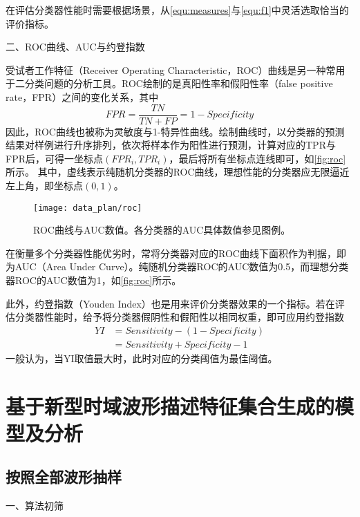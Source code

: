 在评估分类器性能时需要根据场景，从\autoref{equ:measures}与\autoref{equ:f1}中灵活选取恰当的评价指标。

二、ROC曲线、AUC与约登指数

受试者工作特征（Receiver Operating Characteristic，ROC）曲线是另一种常用于二分类问题的分析工具。ROC绘制的是真阳性率和假阳性率（false positive rate，FPR）之间的变化关系，其中
\begin{equation}
      \label{equ:fpr}
      FPR=\frac{TN}{TN+FP}=1-Specificity
\end{equation}
因此，ROC曲线也被称为灵敏度与1-特异性曲线。绘制曲线时，以分类器的预测结果对样例进行升序排列，依次将样本作为阳性进行预测，计算对应的TPR与FPR后，可得一坐标点$({FPR}_i,{TPR}_i)$，最后将所有坐标点连线即可，如\autoref{fig:roc}所示。
其中，虚线表示纯随机分类器的ROC曲线，理想性能的分类器应无限逼近左上角，即坐标点$(0,1)$。
\begin{figure}[htbp]
      \centering
      \texttt{[image: data\_plan/roc]}
      \caption[ROC曲线与AUC数值]{\label{fig:roc}ROC曲线与AUC数值。各分类器的AUC具体数值参见图例。}
\end{figure}

在衡量多个分类器性能优劣时，常将分类器对应的ROC曲线下面积作为判据，即为AUC（Area Under Curve）。纯随机分类器ROC的AUC数值为0.5，而理想分类器ROC的AUC数值为1，如\autoref{fig:roc}所示。

此外，约登指数（Youden Index）也是用来评价分类器效果的一个指标。若在评估分类器性能时，给予将分类器假阴性和假阳性以相同权重，即可应用约登指数
\begin{equation}
      \label{equ:yi}
      \begin{aligned}
            YI&=Sensitivity-(1-Specificity)\\
            &=Sensitivity+Specificity-1
      \end{aligned}
\end{equation}
一般认为，当YI取值最大时，此时对应的分类阈值为最佳阈值\cite{cwl}。

\section{基于新型时域波形描述特征集合生成的模型及分析}

\subsection{按照全部波形抽样}
一、算法初筛

